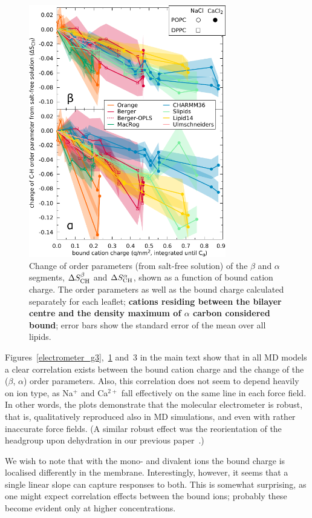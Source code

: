 \documentclass[twoside,twocolumn,9pt]{article}
\begin{document}
\begin{figure}[t]
  \centering
  \includegraphics[width=8.6cm]{../scratch/boundIons/dOP_vs_boundCationCharge_Ca.pdf}
  \caption{\label{electrometer_ca}
    Change of order parameters (from salt-free solution) of the $\beta$ and $\alpha$ segments,
    $\Delta S_{\rm{CH}}^{\beta}$ and $\Delta S_{\rm{CH}}^{\alpha}$,
    shown as a function of bound cation charge.
    The order parameters as well as the bound charge calculated separately for
    each leaflet; {\bf cations residing between the bilayer centre and the density maximum of $\alpha$ carbon
    considered bound}; error bars show the standard error of the mean over all lipids.
    }
\end{figure}

Figures~\ref{electrometer_g3},~\ref{electrometer_ca} and~3 in the main text show that in all MD models a clear correlation exists between the bound cation charge and the change of the ($\beta$, $\alpha$) order parameters. Also, this correlation does not seem to depend heavily on ion type, as Na$^+$ and Ca$^{2+}$ fall effectively on the same line in each force field.
In other words, the plots demonstrate that the molecular electrometer is robust, that is, qualitatively reproduced also in MD simulations, and even with rather inaccurate force fields. (A similar robust effect was the reorientation of the headgroup upon dehydration in our previous paper~\cite{botan15}.)

We wish to note that with the mono- and divalent ions the bound charge is localised differently in the membrane.
Interestingly, however, it seems that a single linear slope can capture responses to both.
This is somewhat surprising, as one might expect correlation effects between the bound ions;
probably these become evident only at higher concentrations.
\end{document}
